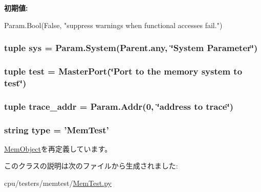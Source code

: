 \label{classMemTest_1_1MemTest_a557248044ce243b3a309dbc63e306990}
{\bfseries 初期値:}
\begin{DoxyCode}
Param.Bool(False,
        "suppress warnings when functional accesses fail.\n")
\end{DoxyCode}
\hypertarget{classMemTest_1_1MemTest_a1f27497e90bf86cc0b513e5c086c9e19}{
\subsubsection[{sys}]{\setlength{\rightskip}{0pt plus 5cm}tuple {\bf sys} = Param.System(Parent.any, \char`\"{}System Parameter\char`\"{})}}
\label{classMemTest_1_1MemTest_a1f27497e90bf86cc0b513e5c086c9e19}
\hypertarget{classMemTest_1_1MemTest_ae2be30e6b14c541b72cb62bdb6169fab}{
\subsubsection[{test}]{\setlength{\rightskip}{0pt plus 5cm}tuple {\bf test} = {\bf MasterPort}(\char`\"{}Port to the memory system to {\bf test}\char`\"{})}}
\label{classMemTest_1_1MemTest_ae2be30e6b14c541b72cb62bdb6169fab}
\hypertarget{classMemTest_1_1MemTest_abca334d46518781adf3b577aaf49b2d5}{
\subsubsection[{trace\_\-addr}]{\setlength{\rightskip}{0pt plus 5cm}tuple {\bf trace\_\-addr} = {\bf Param.Addr}(0, \char`\"{}address to trace\char`\"{})}}
\label{classMemTest_1_1MemTest_abca334d46518781adf3b577aaf49b2d5}
\hypertarget{classMemTest_1_1MemTest_acce15679d830831b0bbe8ebc2a60b2ca}{
\subsubsection[{type}]{\setlength{\rightskip}{0pt plus 5cm}string {\bf type} = '{\bf MemTest}'}}
\label{classMemTest_1_1MemTest_acce15679d830831b0bbe8ebc2a60b2ca}


\hyperlink{classMemObject_1_1MemObject_acce15679d830831b0bbe8ebc2a60b2ca}{MemObject}を再定義しています。

このクラスの説明は次のファイルから生成されました:\begin{DoxyCompactItemize}
\item 
cpu/testers/memtest/\hyperlink{MemTest_8py}{MemTest.py}\end{DoxyCompactItemize}
